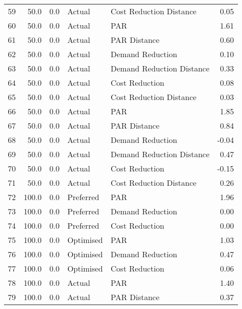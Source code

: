 \begin{longtable}{lrrllr}
59   &         50.0 &     0.0 &         Actual &    Cost Reduction Distance &   0.05 \\
60   &         50.0 &     0.0 &         Actual &                        PAR &   1.61 \\
61   &         50.0 &     0.0 &         Actual &               PAR Distance &   0.60 \\
62   &         50.0 &     0.0 &         Actual &           Demand Reduction &   0.10 \\
63   &         50.0 &     0.0 &         Actual &  Demand Reduction Distance &   0.33 \\
64   &         50.0 &     0.0 &         Actual &             Cost Reduction &   0.08 \\
65   &         50.0 &     0.0 &         Actual &    Cost Reduction Distance &   0.03 \\
66   &         50.0 &     0.0 &         Actual &                        PAR &   1.85 \\
67   &         50.0 &     0.0 &         Actual &               PAR Distance &   0.84 \\
68   &         50.0 &     0.0 &         Actual &           Demand Reduction &  -0.04 \\
69   &         50.0 &     0.0 &         Actual &  Demand Reduction Distance &   0.47 \\
70   &         50.0 &     0.0 &         Actual &             Cost Reduction &  -0.15 \\
71   &         50.0 &     0.0 &         Actual &    Cost Reduction Distance &   0.26 \\
72   &        100.0 &     0.0 &      Preferred &                        PAR &   1.96 \\
73   &        100.0 &     0.0 &      Preferred &           Demand Reduction &   0.00 \\
74   &        100.0 &     0.0 &      Preferred &             Cost Reduction &   0.00 \\
75   &        100.0 &     0.0 &      Optimised &                        PAR &   1.03 \\
76   &        100.0 &     0.0 &      Optimised &           Demand Reduction &   0.47 \\
77   &        100.0 &     0.0 &      Optimised &             Cost Reduction &   0.06 \\
78   &        100.0 &     0.0 &         Actual &                        PAR &   1.40 \\
79   &        100.0 &     0.0 &         Actual &               PAR Distance &   0.37 \\

\end{longtable}

